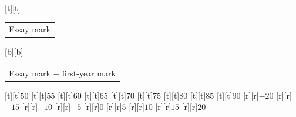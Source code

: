 %    
%
%
\begin{psfrags}%
\psfragscanon%
%
[t][t]{\color[rgb]{0,0,0}\setlength{\tabcolsep}{0pt}\begin{tabular}{c}\Large{}Essay mark\end{tabular}}%
[b][b]{\color[rgb]{0,0,0}\setlength{\tabcolsep}{0pt}\begin{tabular}{c}\Large{}Essay mark $-$ first-year mark\end{tabular}}%
%
[t][t]{$50$}%
[t][t]{$55$}%
[t][t]{$60$}%
[t][t]{$65$}%
[t][t]{$70$}%
[t][t]{$75$}%
[t][t]{$80$}%
[t][t]{$85$}%
[t][t]{$90$}%
%
[r][r]{$-20$}%
[r][r]{$-15$}%
[r][r]{$-10$}%
[r][r]{$-5$}%
[r][r]{$0$}%
[r][r]{$5$}%
[r][r]{$10$}%
[r][r]{$15$}%
[r][r]{$20$}%
%
%
\end{psfrags}%
%
